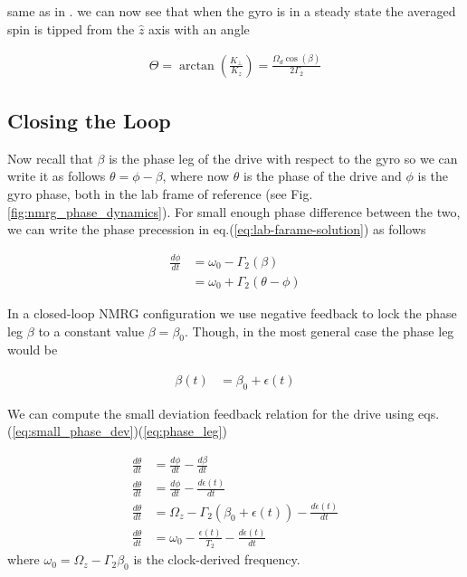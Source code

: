 \documentclass{article}
\begin{document}
same as in \cite{walker2016spin}. we can now see that when the gyro is in a steady state the averaged spin is tipped from the $\hat{z}$ axis with an angle

\begin{align}
    \Theta = \arctan\left(\frac{K_{\perp}}{K_z}\right)=\frac{\Omega_d \cos{\left(\beta\right)}}{2\Gamma_2}
\end{align}

\subsection{Closing the Loop}
Now recall that $\beta$ is the phase leg of the drive with respect to the gyro so we can write it as follows $\theta=\phi - \beta$, where now $\theta$ is the phase of the drive and $\phi$ is the gyro phase, both in the lab frame of reference (see Fig.\ref{fig:nmrg_phase_dynamics}). For small enough phase difference between the two, we can write the phase precession in eq.(\ref{eq:lab-farame-solution}) as follows

\begin{align}
    \frac{d\phi}{dt} &= \omega_0 - \Gamma_2\left(\beta\right)\\
    &= \omega_0 + \Gamma_2\left(\theta - \phi\right)
    \label{eq:small_phase_dev}
\end{align}


In a closed-loop NMRG configuration we use negative feedback to lock the phase leg $\beta$ to a constant value $\beta=\beta_0$. Though, in the most general case the phase leg would be

\begin{align}
    \beta\left(t\right) &= \beta_0 + \epsilon\left(t\right)
    \label{eq:phase_leg}
\end{align}

{\color{green}
We can compute the small deviation feedback relation for the drive using eqs.(\ref{eq:small_phase_dev})(\ref{eq:phase_leg})


\begin{align}
    \frac{d\theta}{dt} &=  \frac{d\phi}{dt} - \frac{d\beta}{dt}\\
    \frac{d\theta}{dt} &=  \frac{d\phi}{dt} - \frac{d\epsilon\left(t\right)}{dt}\\
    \frac{d\theta}{dt} &=  \Omega_z -\Gamma_2 \left(\beta_0 + \epsilon\left(t\right)\right) - \frac{d\epsilon \left(t\right)}{dt}\\
    \frac{d\theta}{dt} &=  \omega_0 -\frac{\epsilon\left(t\right)}{T_2}  - \frac{d\epsilon\left(t\right)}{dt}
\end{align}
where $\omega_0=\Omega_z - \Gamma_2\beta_0$ is the clock-derived frequency.}
\end{document}
